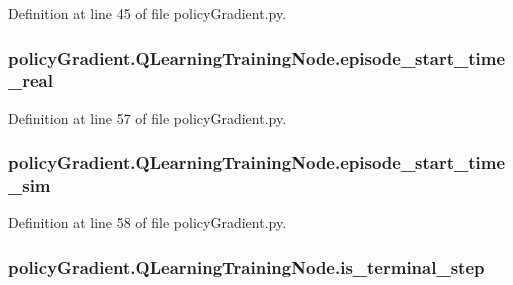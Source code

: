 Definition at line 45 of file policy\+Gradient.\+py.

\subsubsection[{\texorpdfstring{episode\+\_\+start\+\_\+time\+\_\+real}{episode_start_time_real}}]{\setlength{\rightskip}{0pt plus 5cm}policy\+Gradient.\+Q\+Learning\+Training\+Node.\+episode\+\_\+start\+\_\+time\+\_\+real}\hypertarget{classpolicy_gradient_1_1_q_learning_training_node_ac56ce70d12d52d7d95073809ab69f36d}{}\label{classpolicy_gradient_1_1_q_learning_training_node_ac56ce70d12d52d7d95073809ab69f36d}


Definition at line 57 of file policy\+Gradient.\+py.

\subsubsection[{\texorpdfstring{episode\+\_\+start\+\_\+time\+\_\+sim}{episode_start_time_sim}}]{\setlength{\rightskip}{0pt plus 5cm}policy\+Gradient.\+Q\+Learning\+Training\+Node.\+episode\+\_\+start\+\_\+time\+\_\+sim}\hypertarget{classpolicy_gradient_1_1_q_learning_training_node_afd8f11e9f4e59942bed3cb81946f9247}{}\label{classpolicy_gradient_1_1_q_learning_training_node_afd8f11e9f4e59942bed3cb81946f9247}


Definition at line 58 of file policy\+Gradient.\+py.

\subsubsection[{\texorpdfstring{is\+\_\+terminal\+\_\+step}{is_terminal_step}}]{\setlength{\rightskip}{0pt plus 5cm}policy\+Gradient.\+Q\+Learning\+Training\+Node.\+is\+\_\+terminal\+\_\+step}\hypertarget{classpolicy_gradient_1_1_q_learning_training_node_aaf47eb00c62e895e5fa633bdcff4dad6}{}\label{classpolicy_gradient_1_1_q_learning_training_node_aaf47eb00c62e895e5fa633bdcff4dad6}


